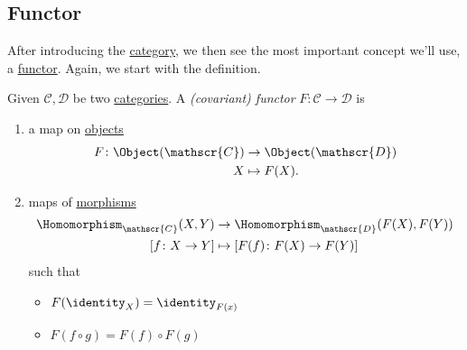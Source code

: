 \subsection{Functor}
After introducing the \hyperref[def:category]{category}, we then see the most important concept we'll use, a \hyperref[def:functor]{functor}.
Again, we start with the definition.
\begin{definition}[Functor]\label{def:functor}
	Given \(\mathscr{C} , \mathscr{D} \) be two \hyperref[def:category]{categories}. A \emph{(covariant) functor} \(F\colon \mathscr{C} \to \mathscr{D}\)
	is
	\begin{enumerate}[(1)]
		\item a map on \hyperref[def:object]{objects}
		      \[
			      \begin{split}
				      F\colon \Object(\mathscr{C} )&\to \Object(\mathscr{D} )\\
				      X&\mapsto F(X).
			      \end{split}
		      \]
		\item maps of \hyperref[def:morphism]{morphisms}
		      \[
			      \begin{split}
				      \Homomorphism_{\mathscr{C} }(X, Y)&\to \Homomorphism_{\mathscr{D} }(F(X), F(Y))\\
				      \left[f\colon X\to Y\right] &\mapsto \left[F(f)\colon F(X)\to F(Y)\right]
			      \end{split}
		      \]
		      such that
		      \begin{itemize}
			      \item \(F(\identity_{X} ) = \identity_{F(x)} \)
			      \item \(F(f\circ g) = F(f)\circ F(g)\)
		      \end{itemize}
	\end{enumerate}
\end{definition}